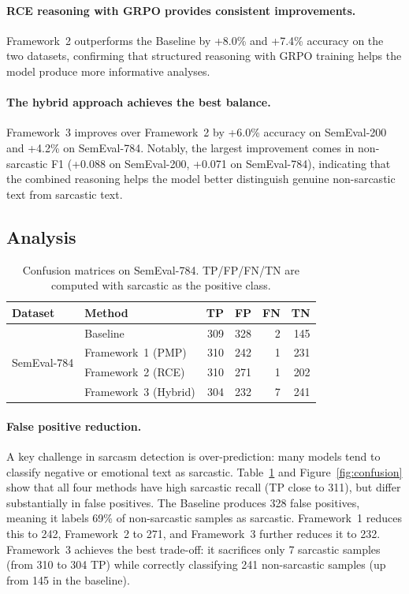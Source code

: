 \documentclass{article}
\begin{document}
\paragraph{RCE reasoning with GRPO provides consistent improvements.}
Framework~2 outperforms the Baseline by +8.0\% and +7.4\% accuracy on the two datasets, confirming that structured reasoning with GRPO training helps the model produce more informative analyses.

\paragraph{The hybrid approach achieves the best balance.}
Framework~3 improves over Framework~2 by +6.0\% accuracy on SemEval-200 and +4.2\% on SemEval-784. Notably, the largest improvement comes in non-sarcastic F1 (+0.088 on SemEval-200, +0.071 on SemEval-784), indicating that the combined reasoning helps the model better distinguish genuine non-sarcastic text from sarcastic text.

\subsection{Analysis}

\begin{table}[t]
\centering
\small
\caption{Confusion matrices on SemEval-784. TP/FP/FN/TN are computed with sarcastic as the positive class.}
\label{tab:confusion}
\begin{tabular}{llrrrr}
\toprule
Dataset & Method & TP & FP & FN & TN \\
\midrule
\multirow{4}{*}{SemEval-784}
    & Baseline            & 309 & 328 &  2 & 145 \\
    & Framework~1 (PMP)   & 310 & 242 &  1 & 231 \\
    & Framework~2 (RCE)   & 310 & 271 &  1 & 202 \\
    & Framework~3 (Hybrid)& 304 & 232 &  7 & 241 \\
\bottomrule
\end{tabular}
\end{table}

\paragraph{False positive reduction.}
A key challenge in sarcasm detection is over-prediction: many models tend to classify negative or emotional text as sarcastic. Table~\ref{tab:confusion} and Figure~\ref{fig:confusion} show that all four methods have high sarcastic recall (TP close to 311), but differ substantially in false positives. The Baseline produces 328 false positives, meaning it labels 69\% of non-sarcastic samples as sarcastic. Framework~1 reduces this to 242, Framework~2 to 271, and Framework~3 further reduces it to 232. Framework~3 achieves the best trade-off: it sacrifices only 7 sarcastic samples (from 310 to 304 TP) while correctly classifying 241 non-sarcastic samples (up from 145 in the baseline).
\end{document}

